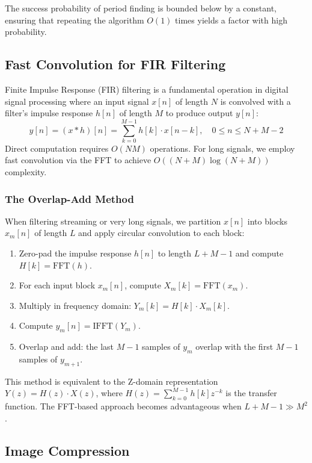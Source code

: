 \documentclass[a4paper]{article}
\theoremstyle{definition}
\begin{document}
The success probability of period finding is bounded below by a constant, ensuring that repeating the algorithm $O(1)$ times yields a factor with high probability. 

\subsection{Fast Convolution for FIR Filtering}

Finite Impulse Response (FIR) filtering is a fundamental operation in digital signal processing where an input signal $x[n]$ of length $N$ is convolved with a filter's impulse response $h[n]$ of length $M$ to produce output $y[n]$:
\[
y[n] = (x * h)[n] = \sum_{k=0}^{M-1} h[k] \cdot x[n-k], \quad 0 \leq n \leq N+M-2
\]
Direct computation requires $O(NM)$ operations. For long signals, we employ fast convolution via the FFT to achieve $O((N+M) \log (N+M))$ complexity.

\subsubsection{The Overlap-Add Method}

When filtering streaming or very long signals, we partition $x[n]$ into blocks $x_m[n]$ of length $L$ and apply circular convolution to each block:
\begin{enumerate}
    \item Zero-pad the impulse response $h[n]$ to length $L+M-1$ and compute $H[k] = \text{FFT}(h)$.
    \item For each input block $x_m[n]$, compute $X_m[k] = \text{FFT}(x_m)$.
    \item Multiply in frequency domain: $Y_m[k] = H[k] \cdot X_m[k]$.
    \item Compute $y_m[n] = \text{IFFT}(Y_m)$.
    \item Overlap and add: the last $M-1$ samples of $y_m$ overlap with the first $M-1$ samples of $y_{m+1}$.
\end{enumerate}

This method is equivalent to the Z-domain representation $Y(z) = H(z) \cdot X(z)$, where $H(z) = \sum_{k=0}^{M-1} h[k]z^{-k}$ is the transfer function. The FFT-based approach becomes advantageous when $L+M-1 \gg M^2$.

\subsection{Image Compression}
\end{document}
